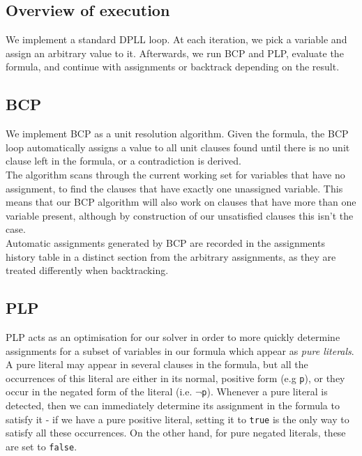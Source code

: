 \documentclass[a4paper]{article}
\begin{document}
\subsection{Overview of execution}

We implement a standard DPLL loop. At each iteration, we pick a variable and assign an arbitrary value to it. Afterwards, we run BCP and PLP, evaluate the formula, and continue with assignments or backtrack depending on the result.\\

\subsection{BCP}

We implement BCP as a unit resolution algorithm. Given the formula, the BCP loop automatically assigns a value to all unit clauses found until there is no unit clause left in the formula, or a contradiction is derived.\\

The algorithm scans through the current working set for variables that have no assignment, to find the clauses that have exactly one unassigned variable. This means that our BCP algorithm will also work on clauses that have more than one variable present, although by construction of our unsatisfied clauses this isn't the case.\\

Automatic assignments generated by BCP are recorded in the assignments history table in a distinct section from the arbitrary assignments, as they are treated differently when backtracking.\\

\subsection{PLP}

PLP acts as an optimisation for our solver in order to more quickly determine assignments for a subset of variables in our formula which appear as \textit{pure literals}. A pure literal may appear in several clauses in the formula, but all the occurrences of this literal are either in its normal, positive form (e.g \texttt{p}), or they occur in the negated form of the literal (i.e. $\neg$\texttt{p}). Whenever a pure literal is detected, then we can immediately determine its assignment in the formula to satisfy it - if we have a pure positive literal, setting it to \texttt{true} is the only way to satisfy all these occurrences. On the other hand, for pure negated literals, these are set to \texttt{false}. \\
\end{document}
